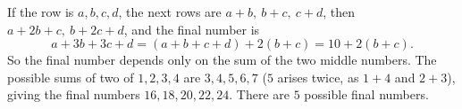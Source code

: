 If the row is $a,b,c,d$, the next rows are $a+b,\ b+c,\ c+d$, then $a+2b+c,\ b+2c+d$, and the final number is
\[
a+3b+3c+d=(a+b+c+d)+2(b+c)=10+2(b+c).
\]
So the final number depends only on the sum of the two middle numbers. The possible sums of two of $1,2,3,4$ are $3,4,5,6,7$ ($5$ arises twice, as $1+4$ and $2+3$), giving the final numbers $16,18,20,22,24$. There are $\boxed{5}$ possible final numbers.
